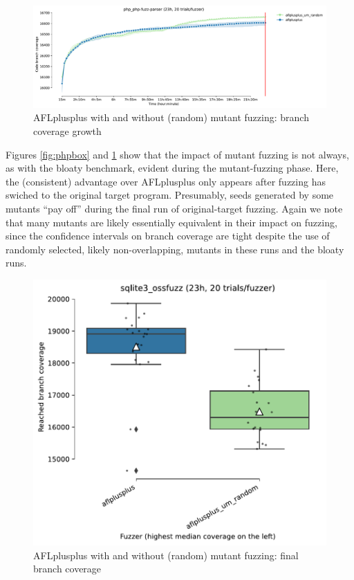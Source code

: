 \begin{figure}
  \includegraphics[width=0.75\columnwidth]{php_php-fuzz-parser_coverage_growth.pdf}
  \caption{AFLplusplus with and without (random) mutant fuzzing: branch coverage growth}
  \label{fig:phpgrowth}  
\end{figure}

Figures \ref{fig:phpbox} and \ref{fig:phpgrowth} show that the impact of mutant fuzzing is not always, as with the bloaty benchmark, evident during the mutant-fuzzing phase.  Here, the (consistent) advantage over AFLplusplus only appears after fuzzing has swiched to the original target program.  Presumably, seeds generated by some mutants ``pay off'' during the final run of original-target fuzzing.  Again we note that many mutants are likely essentially equivalent in their impact on fuzzing, since the confidence intervals on branch coverage are tight despite the use of randomly selected, likely non-overlapping, mutants in these runs and the bloaty runs.

\begin{figure}
  \includegraphics[width=0.75\columnwidth]{sqlite3_ossfuzz_boxplot.pdf}
  \caption{AFLplusplus with and without (random) mutant fuzzing: final branch coverage}
  \label{fig:sqlitebox}
  
\end{figure}

